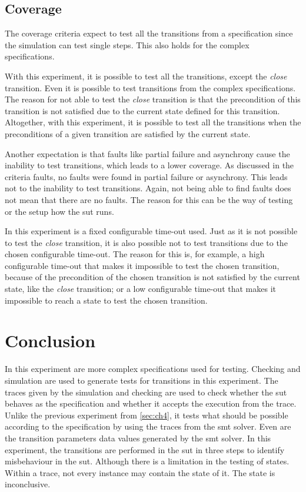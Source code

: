 \subsection{Coverage}

The coverage criteria expect to test all the transitions from a
specification since the simulation can test single steps. This also holds
for the complex specifications.

With this experiment, it is possible to test all the transitions, except the
\textit{close} transition. Even it is possible to test transitions from the
complex specifications. The reason for not able to test the \textit{close}
transition is that the precondition of this transition is not satisfied due to
the current state defined for this transition. Altogether, with this experiment,
it is possible to test all the transitions when the preconditions of a given
transition are satisfied by the current state.

Another expectation is that faults like partial failure and asynchrony cause
the inability to test transitions, which leads to a lower coverage. As discussed
in the criteria faults, no faults were found in partial failure or asynchrony.
This leads not to the inability to test transitions. Again, not being able to
find faults does not mean that there are no faults. The reason for this can be the
way of testing or the setup how the \gls{sut} runs.

In this experiment is a fixed configurable time-out used. Just as it is not
possible to test the \textit{close} transition, it is also possible not to test
transitions due to the chosen configurable time-out.
The reason for this is, for example, a high configurable time-out that makes it
impossible to test the chosen transition, because of the precondition of the
chosen transition is not satisfied by the current state, like the \textit{close}
transition; or a low configurable time-out that makes it impossible to reach a
state to test the chosen transition.

\section{Conclusion}
In this experiment are more complex specifications used for testing.
Checking and simulation are used to generate tests for transitions in this
experiment. The traces given by the simulation and checking are used to check
whether the \gls{sut} behaves as the specification and whether it accepts the
execution from the trace. Unlike the previous experiment from
\autoref{sec:ch4}, it tests what should be possible according to the
specification by using the traces from the \gls{smt} solver. Even are the transition
parameters data values generated by the \gls{smt} solver. In this experiment,
the transitions are performed in the \gls{sut} in three steps to identify misbehaviour in
the \gls{sut}. Although there is a limitation in the testing of states. Within a
trace, not every instance may contain the state of it.
The state is inconclusive.

